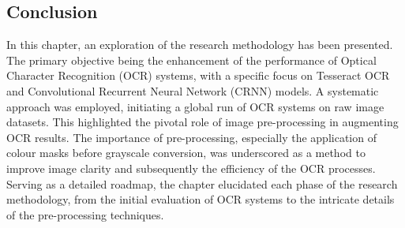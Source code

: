 \newpage

\subsection{Conclusion}

In this chapter, an exploration of the research methodology has been presented. The primary objective being the enhancement of the performance of Optical Character Recognition (OCR) systems, with a specific focus on Tesseract OCR and Convolutional Recurrent Neural Network (CRNN) models. A systematic approach was employed, initiating a global run of OCR systems on raw image datasets. This highlighted the pivotal role of image pre-processing in augmenting OCR results. The importance of pre-processing, especially the application of colour masks before grayscale conversion, was underscored as a method to improve image clarity and subsequently the efficiency of the OCR processes. Serving as a detailed roadmap, the chapter elucidated each phase of the research methodology, from the initial evaluation of OCR systems to the intricate details of the pre-processing techniques.


